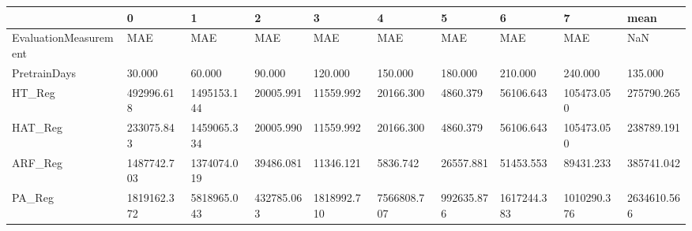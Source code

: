 \begin{tabular}{llllllllll}
\toprule
{} &           0 &           1 &          2 &           3 &           4 &          5 &           6 &           7 &        mean \\
\midrule
EvaluationMeasurement &         MAE &         MAE &        MAE &         MAE &         MAE &        MAE &         MAE &         MAE &         NaN \\
PretrainDays          &      30.000 &      60.000 &     90.000 &     120.000 &     150.000 &    180.000 &     210.000 &     240.000 &     135.000 \\
HT\_Reg                &  492996.618 & 1495153.144 &  20005.991 &   11559.992 &   20166.300 &   4860.379 &   56106.643 &  105473.050 &  275790.265 \\
HAT\_Reg               &  233075.843 & 1459065.334 &  20005.990 &   11559.992 &   20166.300 &   4860.379 &   56106.643 &  105473.050 &  238789.191 \\
ARF\_Reg               & 1487742.703 & 1374074.019 &  39486.081 &   11346.121 &    5836.742 &  26557.881 &   51453.553 &   89431.233 &  385741.042 \\
PA\_Reg                & 1819162.372 & 5818965.043 & 432785.063 & 1818992.710 & 7566808.707 & 992635.876 & 1617244.383 & 1010290.376 & 2634610.566 \\
\bottomrule
\end{tabular}

